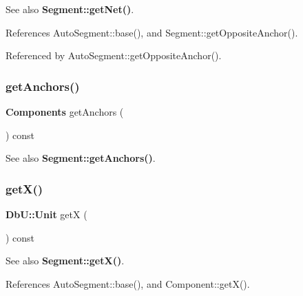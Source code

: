 \begin{DoxySeeAlso}{See also}
\textbf{ Segment\+::get\+Net()}. 
\end{DoxySeeAlso}


References Auto\+Segment\+::base(), and Segment\+::get\+Opposite\+Anchor().



Referenced by Auto\+Segment\+::get\+Opposite\+Anchor().

\mbox{\label{classKatabatic_1_1AutoSegment_a7339a1ebc7d46384bc4e1317af84bea1}} 
\subsubsection{\texorpdfstring{get\+Anchors()}{getAnchors()}}
{\footnotesize\ttfamily \textbf{ Components} get\+Anchors (\begin{DoxyParamCaption}{ }\end{DoxyParamCaption}) const\hspace{0.3cm}{\ttfamily [inline]}}

\begin{DoxySeeAlso}{See also}
\textbf{ Segment\+::get\+Anchors()}. 
\end{DoxySeeAlso}
\mbox{\label{classKatabatic_1_1AutoSegment_a00b8f54c8171f6699e57de1b8c18eeb1}} 
\subsubsection{\texorpdfstring{get\+X()}{getX()}}
{\footnotesize\ttfamily \textbf{ Db\+U\+::\+Unit} getX (\begin{DoxyParamCaption}{ }\end{DoxyParamCaption}) const\hspace{0.3cm}{\ttfamily [virtual]}}

\begin{DoxySeeAlso}{See also}
\textbf{ Segment\+::get\+X()}. 
\end{DoxySeeAlso}


References Auto\+Segment\+::base(), and Component\+::get\+X().



